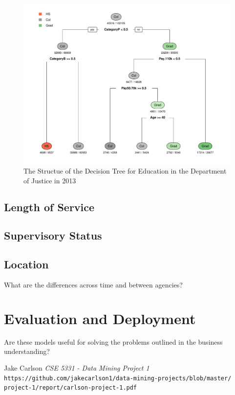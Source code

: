 \documentclass{article}
\begin{document}
    \begin{center}
        \begin{figure}
            \includegraphics[scale=0.4]{./images/edu-decision-tree-2013.pdf}
            \caption{The Structue of the Decision Tree for Education in the Department of Justice in 2013}
            \label{edudesctree2013}
        \end{figure}
    \end{center}

    \subsection{Length of Service}

    \subsection{Supervisory Status}

    \subsection{Location}

What are the differences across time and between agencies?

\section{Evaluation and Deployment}
Are these models useful for solving the problems outlined in the business understanding?

\begin{thebibliography}{10}
    Jake Carlson
    \textit{CSE 5331 - Data Mining Project 1}
    \texttt{https://github.com/jakecarlson1/data-mining-projects/blob/master/}
    \texttt{project-1/report/carlson-project-1.pdf}

\end{thebibliography}
\end{document}

